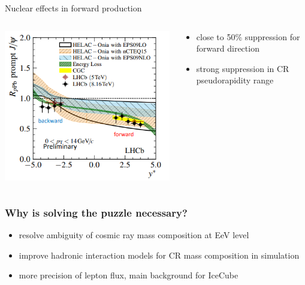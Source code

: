 \documentclass[aspectratio=1610, 9pt]{beamer}
\begin{document}
\begin{frame}{Nuclear effects in forward production}
  \begin{columns}
    \begin{column}[c]{0.48\textwidth}
      \includegraphics[width=\textwidth]{plots/suppression.png}
    \end{column}
    \begin{column}[c]{0.48\textwidth}
      \begin{itemize}
        \item close to 50\% suppression for forward direction
        \item strong suppression in CR pseudorapidity range
      \end{itemize}
    \end{column}
  \end{columns}
\end{frame}

\begin{frame}\frametitle{Why is solving the puzzle necessary?}
  \begin{itemize}
    \item resolve ambiguity of cosmic ray mass composition at EeV level
    \item improve hadronic interaction models for CR mass composition in simulation
    \item more precision of lepton flux, main background for IceCube
  \end{itemize}
\end{frame}
\end{document}
